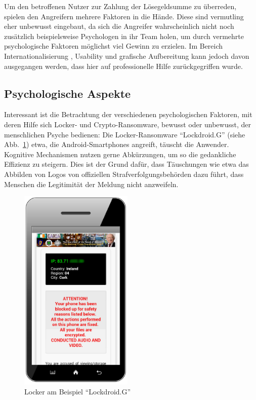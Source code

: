 Um den betroffenen Nutzer zur Zahlung der Lösegeldsumme zu überreden, spielen den Angreifern mehrere Faktoren in die Hände. Diese sind vermutling eher unbewusst eingebaut, da sich die Angreifer wahrscheinlich nicht noch zusätzlich beispielsweise Psychologen in ihr Team holen, um durch vermehrte psychologische Faktoren möglichst viel Gewinn zu erzielen. Im Bereich Internationalisierung \cite{faktoren:l18n}, Usability und grafische Aufbereitung \cite{faktoren:grafik} \cite{evolution} kann jedoch davon ausgegangen werden, dass hier auf professionelle Hilfe zurückgegriffen wurde.

\subsection{Psychologische Aspekte}

Interessant ist die Betrachtung der verschiedenen psychologischen Faktoren, mit deren Hilfe sich Locker- und Crypto-Ransomware, bewusst oder unbewusst, der menschlichen Psyche bedienen:
Die Locker-Ransomware "`Lockdroid.G"' (siehe Abb.~\ref{fig:lockdroid}) etwa, die Android-Smartphones angreift, täuscht die Anwender. Kognitive Mechanismen nutzen gerne Abkürzungen, um so die gedankliche Effizienz zu steigern. Dies ist der Grund dafür, dass Täuschungen wie etwa das Abbilden von Logos von offiziellen Strafverfolgungsbehörden dazu führt, dass Menschen die Legitimität der Meldung nicht anzweifeln. 

\begin{figure}
  \begin{center}
    \includegraphics[width=0.48\textwidth]{img/android_locker.png}
  \end{center}
  \caption{Locker am Beispiel ``Lockdroid.G'' \cite{evolution}}
  \label{fig:lockdroid}
\end{figure}

